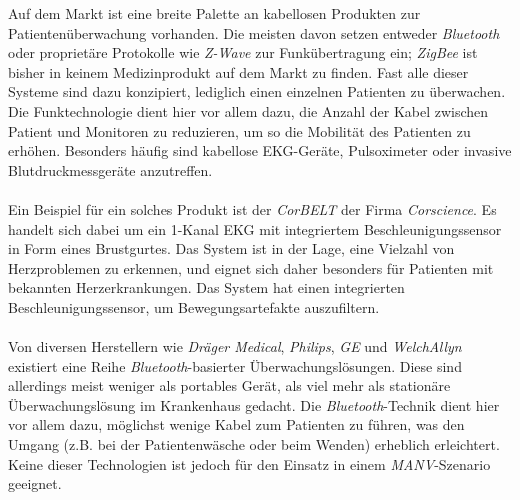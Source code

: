 Auf dem Markt ist eine breite Palette an kabellosen Produkten zur Patientenüberwachung vorhanden. Die meisten davon setzen
entweder \emph{Bluetooth} oder proprietäre Protokolle wie \emph{Z-Wave} zur Funkübertragung ein; \emph{ZigBee} ist bisher in
keinem Medizinprodukt auf dem Markt zu finden. Fast alle dieser Systeme sind dazu konzipiert, lediglich einen einzelnen 
Patienten zu überwachen. Die Funktechnologie dient hier vor allem dazu, die Anzahl der Kabel zwischen Patient und Monitoren 
zu reduzieren, um so die Mobilität des Patienten zu erhöhen. Besonders häufig sind kabellose EKG-Geräte, Pulsoximeter oder 
invasive Blutdruckmessgeräte anzutreffen. \\
\\             
Ein Beispiel für ein solches Produkt ist der \emph{CorBELT} der Firma \emph{Corscience}. Es handelt sich dabei
um ein 1-Kanal EKG mit integriertem Beschleunigungssensor in Form eines Brustgurtes. Das System ist in der
Lage, eine Vielzahl von Herzproblemen zu erkennen, und 
eignet sich daher besonders für Patienten mit bekannten
Herzerkrankungen. Das System hat einen integrierten Beschleunigungssensor, um Bewegungsartefakte auszufiltern.\cite{Corscience}
\\
\\
Von diversen Herstellern wie \emph{Dräger Medical}, \emph{Philips}, \emph{GE} und \emph{WelchAllyn} existiert eine 
Reihe \emph{Bluetooth}-basierter Überwachungslösungen. Diese sind allerdings meist weniger als portables Gerät, als viel 
mehr als stationäre Überwachungslösung im Krankenhaus gedacht. Die \emph{Bluetooth}-Technik dient hier vor allem dazu, 
möglichst wenige Kabel zum Patienten zu führen, was den Umgang (z.B. bei der Patientenwäsche oder beim Wenden)
erheblich erleichtert. Keine dieser Technologien ist jedoch für den Einsatz in einem \emph{MANV}-Szenario
geeignet.
       

